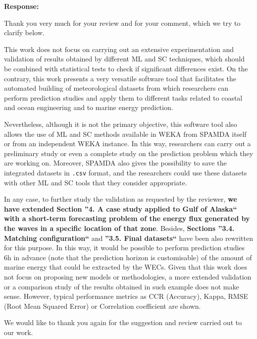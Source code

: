 \documentclass[a4paper,twoside,11pt]{article}
\begin{document}
\textbf{Response:}
{
Thank you very much for your review and for your comment, which we try to clarify below.

This work does not focus on carrying out an extensive experimentation and validation of results obtained by different ML and SC techniques, which should be combined with statistical tests to check if significant differences exist. On the contrary, this work presents a very versatile software tool that facilitates the automated building of meteorological datasets from which researchers can perform prediction studies and apply them to different tasks related to coastal and ocean engineering and to marine energy prediction.

Nevertheless, although it is not the primary objective, this software tool also allows the use of ML and SC methods available in WEKA from SPAMDA itself or from an independent WEKA instance. In this way, researchers can carry out a preliminary study or even a complete study on the prediction problem which they are working on. Moreover, SPAMDA also gives the possibility to save the integrated datasets in \texttt{.csv} format, and the researchers could use these datasets with other ML and SC tools that they consider appropriate.


In any case, to further study the validation as requested by the reviewer, \textbf{we have extended Section ''4. A case study applied to Gulf of Alaska`` with a short-term forecasting problem of the energy flux generated by the waves in a specific location of that zone}. Besides, \textbf{Sections ''3.4. Matching configuration``} and \textbf{''3.5. Final datasets``} have been also rewritten for this purpose. In this way, it would be possible to perform prediction studies 6h in advance (note that the prediction horizon is customisable) of the amount of marine energy that could be extracted by the WECs. Given that this work does not focus on proposing new models or methodologies, a more extended validation or a comparison study of the results obtained in such example does not make sense. However, typical performance metrics as CCR (Accuracy), Kappa, RMSE (Root Mean Squared Error) or Correlation coefficient are shown.

We would like to thank you again for the suggestion and review carried out to our work.
}
\end{document}
